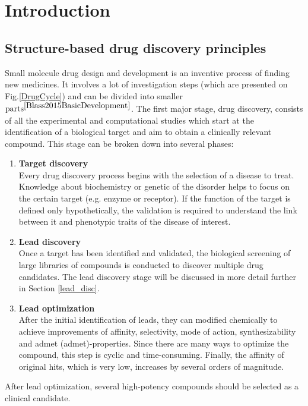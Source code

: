 \chapter{Introduction}
\section{Structure-based drug discovery principles}
Small molecule drug design and development is an inventive process of finding new medicines. 
It involves a lot of investigation steps (which are presented on Fig.\ref{DrugCycle}) and can be divided into smaller $\text{parts}^{\cite{Blass2015BasicDevelopment}}$. 
The first major stage, drug discovery, consists of all the experimental and computational studies which start at the identification of a biological target and aim to obtain a clinically relevant compound.
This stage can be broken down into several phases:
\begin{enumerate}
    \item \textbf{Target discovery}\\
    Every drug discovery process begins with the selection of a disease to treat.
    Knowledge about biochemistry or genetic of the disorder helps to focus on the certain target (e.g. enzyme or receptor).
    If the function of the target is defined only hypothetically, the validation is required to understand the link between it and phenotypic traits of the disease of interest.
    \item \textbf{Lead discovery}\\
    Once a target has been identified and validated, the biological screening of large libraries of compounds is conducted to discover multiple drug candidates.
    The lead discovery stage will be discussed in more detail further in Section \ref{lead_disc}.
    \item \textbf{Lead optimization}\\
    After the initial identification of leads, they can modified chemically to achieve improvements of  affinity, selectivity, mode of action, synthesizability and \acrshort{admet} (\acrlong{admet})-properties.  
    Since there are many ways to optimize the compound, this step is cyclic and time-consuming. Finally, the affinity of \glqq original hits\grqq, which is very low, increases by several orders of magnitude.
\end{enumerate}

After lead optimization, several high-potency compounds should be selected as a clinical candidate.

